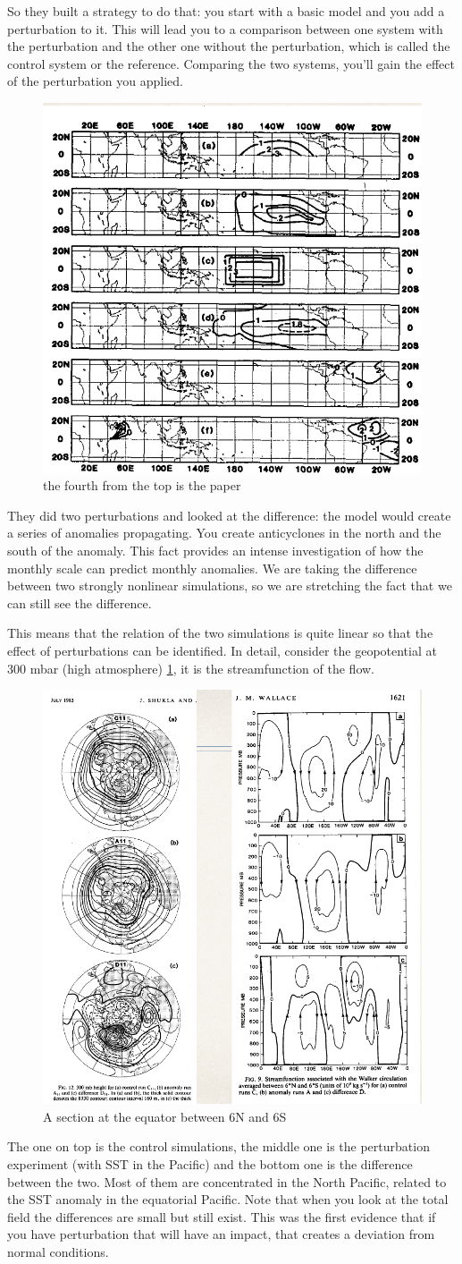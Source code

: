 So they built a strategy to do that: you start with a basic model and you add a perturbation to it. This will lead you to a comparison between one system with the perturbation and the other one without the perturbation, which is called the control system or the reference. Comparing the two systems, you'll gain the effect of the perturbation you applied. 

\begin{figure}[htpb]
    \centering
    \includegraphics[width=0.35\linewidth]{uploads/Screenshot 2024-11-20 212353.png}
    \caption{the fourth from the top is the paper}
   
\end{figure}
They did two perturbations and looked at the difference: the model would create a series of anomalies propagating. You create anticyclones in the north and the south of the anomaly. This fact provides an intense investigation of how the monthly scale can predict monthly anomalies. We are taking the difference between two strongly nonlinear simulations, so we are stretching the fact that we can still see the difference. 

This means that the relation of the two simulations is quite linear so that the effect of perturbations can be identified. In detail, consider the geopotential at 300 mbar (high atmosphere) \ref{fig:figure 1.7}, it is the streamfunction of the flow. 
\begin{figure}[htpb]
    \centering
    \includegraphics[width=0.4\linewidth]{uploads/Screenshot 2024-11-20 212453.png}
    \caption{A section at the equator between 6N and 6S }
    \label{fig:figure 1.7}
\end{figure}
The one on top is the control simulations, the middle one is the perturbation experiment (with SST in the Pacific) and the bottom one is the difference between the two. 
Most of them are concentrated in the North Pacific, related to the SST anomaly in the equatorial Pacific. Note that when you look at the total field the differences are small but still exist.
This was the first evidence that if you have perturbation that will have an impact, that creates a deviation from normal conditions.  

